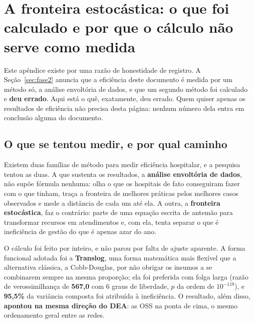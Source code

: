 \section{A fronteira estocástica: o que foi calculado e por que o
cálculo não serve como medida}
\label{ap:sfa}

\setcounter{figure}{0}
\renewcommand{\thefigure}{\thesection.\arabic{figure}}
\setcounter{table}{0}
\renewcommand{\thetable}{\thesection.\arabic{table}}

Este apêndice existe por uma razão de honestidade de registro. A
Seção~\ref{sec:fase2} anuncia que a eficiência deste documento é medida
por um método só, a análise envoltória de dados, e que um segundo método
foi calculado e \textbf{deu errado}. Aqui está o quê, exatamente, deu
errado. Quem quiser apenas os resultados de eficiência não precisa desta
página: nenhum número dela entra em conclusão alguma do documento.

\subsection*{O que se tentou medir, e por qual caminho}

Existem duas famílias de método para medir eficiência hospitalar, e a
pesquisa tentou as duas. A que sustenta os resultados, a
\textbf{análise envoltória de dados}, não supõe fórmula nenhuma: olha o
que os hospitais de fato conseguiram fazer com o que tinham, traça a
fronteira de melhores práticas pelos melhores casos observados e mede a
distância de cada um até ela. A outra, a \textbf{fronteira estocástica},
faz o contrário: parte de uma equação escrita de antemão para
transformar recursos em atendimentos e, com ela, tenta separar o que é
ineficiência de gestão do que é apenas azar do ano.

O cálculo foi feito por inteiro, e não parou por falta de ajuste
aparente. A forma funcional adotada foi a \textbf{Translog}, uma forma
matemática mais flexível que a alternativa clássica, a Cobb-Douglas, por
não obrigar os insumos a se combinarem sempre na mesma proporção; ela
foi preferida com folga larga (razão de verossimilhança de \textbf{567,0}
com 6 graus de liberdade, $p$ da ordem de $10^{-119}$), e
\textbf{95,5\%} da variância composta foi atribuída à ineficiência. O
resultado, além disso, \textbf{apontou na mesma direção do DEA}: as OSS
na ponta de cima, o mesmo ordenamento geral entre as redes.


